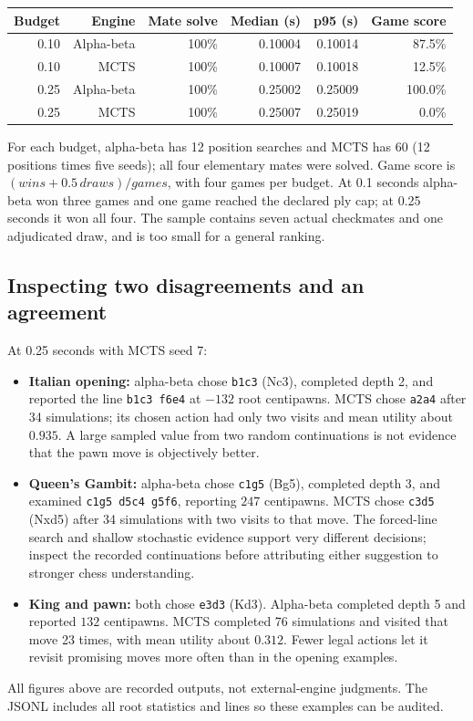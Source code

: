 \begin{center}
\begin{tabular}{rrrrrr}
\toprule
Budget & Engine & Mate solve & Median (s) & p95 (s) & Game score\\
\midrule
0.10 & Alpha-beta & 100\% & 0.10004 & 0.10014 & 87.5\% \\
0.10 & MCTS & 100\% & 0.10007 & 0.10018 & 12.5\% \\
0.25 & Alpha-beta & 100\% & 0.25002 & 0.25009 & 100.0\% \\
0.25 & MCTS & 100\% & 0.25007 & 0.25019 & 0.0\% \\
\bottomrule
\end{tabular}
\end{center}
For each budget, alpha-beta has 12 position searches and MCTS has 60
(12 positions times five seeds); all four elementary mates were solved.
Game score is $(wins+0.5\,draws)/games$, with four games per budget.
At 0.1 seconds alpha-beta won three games and one game reached the declared
ply cap; at 0.25 seconds it won all four. The sample contains seven actual
checkmates and one adjudicated draw, and is too small for a general ranking.

\subsection{Inspecting two disagreements and an agreement}
At 0.25 seconds with MCTS seed 7:
\begin{itemize}
\item \textbf{Italian opening:} alpha-beta chose \texttt{b1c3} (Nc3), completed
 depth 2, and reported the line \texttt{b1c3 f6e4} at $-132$ root centipawns.
 MCTS chose \texttt{a2a4} after 34 simulations; its chosen action had only two
 visits and mean utility about $0.935$. A large sampled value from two random
 continuations is not evidence that the pawn move is objectively better.
\item \textbf{Queen's Gambit:} alpha-beta chose \texttt{c1g5} (Bg5), completed
 depth 3, and examined \texttt{c1g5 d5c4 g5f6}, reporting $247$ centipawns.
 MCTS chose \texttt{c3d5} (Nxd5) after 34 simulations with two visits to that
 move. The forced-line search and shallow stochastic evidence support very
 different decisions; inspect the recorded continuations before attributing
 either suggestion to stronger chess understanding.
\item \textbf{King and pawn:} both chose \texttt{e3d3} (Kd3). Alpha-beta completed
 depth 5 and reported $132$ centipawns. MCTS completed 76 simulations and visited
 that move 23 times, with mean utility about $0.312$. Fewer legal actions let
 it revisit promising moves more often than in the opening examples.
\end{itemize}
All figures above are recorded outputs, not external-engine judgments.
The JSONL includes all root statistics and lines so these examples can be audited.
